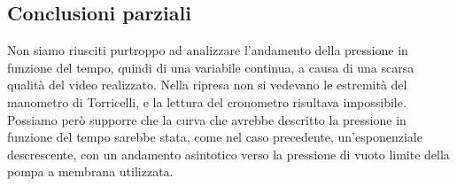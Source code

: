 \subsection{Conclusioni parziali}

Non siamo riusciti purtroppo ad analizzare l'andamento della pressione in funzione del tempo, quindi di una variabile continua, a causa di una scarsa qualità del video realizzato. Nella ripresa non si vedevano le estremità del manometro di Torricelli, e la lettura del cronometro risultava impossibile. Possiamo però supporre che la curva che avrebbe descritto la pressione in funzione del tempo sarebbe stata, come nel caso precedente, un'esponenziale descrescente, con un andamento asintotico verso la pressione di vuoto limite della pompa a membrana utilizzata.
